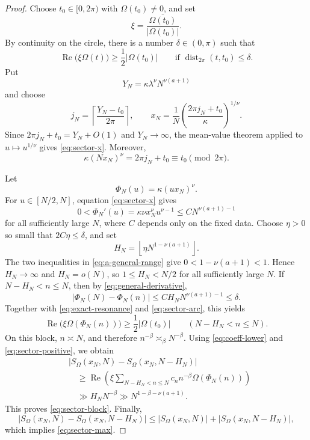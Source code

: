\documentclass[10pt,a4paper]{amsart}
\newcommand{\distT}{\operatorname{dist}_{2\pi}}
\begin{document}
\begin{proof}
Choose $t_0\in[0,2\pi)$ with $\Omega(t_0)\ne0$, and set
\[
  \xi=\frac{\overline{\Omega(t_0)}}{|\Omega(t_0)|}.
\]
By continuity on the circle, there is a number $\delta\in(0,\pi)$ such that
\begin{equation}\label{eq:sector-arc}
  \operatorname{Re}\bigl(\xi\Omega(t)\bigr)
  \ge\frac12|\Omega(t_0)|
  \qquad
  \text{if }\distT(t,t_0)\le\delta.
\end{equation}
Put
\[
  Y_N=\kappa\lambda^\nu N^{\nu(a+1)}
\]
and choose
\begin{equation}\label{eq:j-choice}
  j_N=\left\lceil\frac{Y_N-t_0}{2\pi}\right\rceil,
  \qquad
  x_N=\frac1N
  \left(\frac{2\pi j_N+t_0}{\kappa}\right)^{1/\nu}.
\end{equation}
Since $2\pi j_N+t_0=Y_N+O(1)$ and $Y_N\to\infty$, the mean-value theorem applied to $u\mapsto u^{1/\nu}$ gives \eqref{eq:sector-x}.  Moreover,
\begin{equation}\label{eq:exact-resonance}
  \kappa(Nx_N)^\nu=2\pi j_N+t_0
  \equiv t_0\pmod{2\pi}.
\end{equation}

Let
\[
  \Phi_N(u)=\kappa(ux_N)^\nu.
\]
For $u\in[N/2,N]$, equation \eqref{eq:sector-x} gives
\begin{equation}\label{eq:general-derivative}
  0<\Phi_N'(u)
  =\kappa\nu x_N^\nu u^{\nu-1}
  \le C N^{\nu(a+1)-1}
\end{equation}
for all sufficiently large $N$, where $C$ depends only on the fixed data.  Choose $\eta>0$ so small that $2C\eta\le\delta$, and set
\begin{equation}\label{eq:H-choice-general}
  H_N=\left\lfloor\eta N^{1-\nu(a+1)}\right\rfloor.
\end{equation}
The two inequalities in \eqref{eq:a-general-range} give
$0<1-\nu(a+1)<1$.  Hence $H_N\to\infty$ and $H_N=o(N)$, so $1\le H_N<N/2$ for all sufficiently large $N$.  If $N-H_N<n\le N$, then by \eqref{eq:general-derivative},
\[
  |\Phi_N(N)-\Phi_N(n)|
  \le C H_NN^{\nu(a+1)-1}
  \le\delta.
\]
Together with \eqref{eq:exact-resonance} and \eqref{eq:sector-arc}, this yields
\begin{equation}\label{eq:sector-positive}
  \operatorname{Re}\bigl(\xi\Omega(\Phi_N(n))\bigr)
  \ge\frac12|\Omega(t_0)|
  \qquad(N-H_N<n\le N).
\end{equation}
On this block, $n\asymp N$, and therefore $n^{-\beta}\asymp_{\beta}N^{-\beta}$.  Using \eqref{eq:coeff-lower} and \eqref{eq:sector-positive}, we obtain
\begin{align*}
  &\bigl|S_{\Omega}(x_N,N)-S_{\Omega}(x_N,N-H_N)\bigr|\\
  &\quad\ge
  \operatorname{Re}\!\left(
    \xi\sum_{N-H_N<n\le N}
    c_n n^{-\beta}\Omega(\Phi_N(n))
  \right)\\
  &\quad\gg H_NN^{-\beta}
  \gg N^{1-\beta-\nu(a+1)}.
\end{align*}
This proves \eqref{eq:sector-block}.  Finally,
\[
  |S_{\Omega}(x_N,N)-S_{\Omega}(x_N,N-H_N)|
  \le |S_{\Omega}(x_N,N)|+|S_{\Omega}(x_N,N-H_N)|,
\]
which implies \eqref{eq:sector-max}.
\end{proof}
\end{document}
